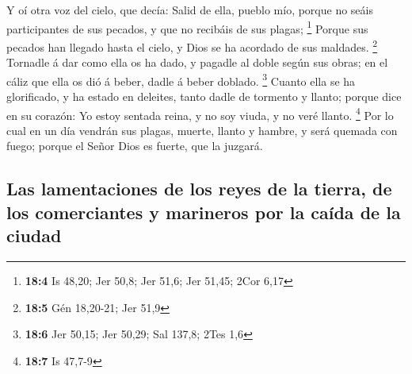  Y oí otra voz del cielo, que decía: Salid de ella, pueblo
mío, porque no seáis participantes de sus pecados, y que no recibáis de
sus plagas; \footnote{\textbf{18:4} Is 48,20; Jer 50,8; Jer 51,6; Jer
  51,45; 2Cor 6,17}  Porque sus pecados han llegado hasta
el cielo, y Dios se ha acordado de sus maldades. \footnote{\textbf{18:5}
  Gén 18,20-21; Jer 51,9}  Tornadle á dar como ella os ha
dado, y pagadle al doble según sus obras; en el cáliz que ella os dió á
beber, dadle á beber doblado. \footnote{\textbf{18:6} Jer 50,15; Jer
  50,29; Sal 137,8; 2Tes 1,6}  Cuanto ella se ha
glorificado, y ha estado en deleites, tanto dadle de tormento y llanto;
porque dice en su corazón: Yo estoy sentada reina, y no soy viuda, y no
veré llanto. \footnote{\textbf{18:7} Is 47,7-9}  Por lo
cual en un día vendrán sus plagas, muerte, llanto y hambre, y será
quemada con fuego; porque el Señor Dios es fuerte, que la juzgará.

\hypertarget{las-lamentaciones-de-los-reyes-de-la-tierra-de-los-comerciantes-y-marineros-por-la-cauxedda-de-la-ciudad}{%
\subsection{Las lamentaciones de los reyes de la tierra, de los
comerciantes y marineros por la caída de la
ciudad}\label{las-lamentaciones-de-los-reyes-de-la-tierra-de-los-comerciantes-y-marineros-por-la-cauxedda-de-la-ciudad}}

